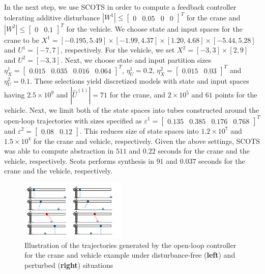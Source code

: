 In the next step, we use SCOTS in order to compute a feedback controller tolerating additive disturbance $|W^1|\leq\begin{bmatrix}0&0.05&0&0\end{bmatrix}^T$ for the crane and $|W^2|\leq\begin{bmatrix}0&0.1\end{bmatrix}^T$ for the vehicle. %
We choose state and input spaces for the crane to be $X^{1}=[-0.195,5.49]\times[-1.99,4.37]\times[1.20,4.68]\times[-5.44,5.28]$ and $U^{1}=[-7,7]$, respectively. For the vehicle, we set $X^{2}=[-3,3]\times[2,9]$ and $U^{2}=[-3,3]$. %
Next, we choose state and input partition sizes $\eta_{{X}}^{1}=\begin{bmatrix}0.015&0.035&0.016&0.064\end{bmatrix}^T$, $\eta_{U}^1=0.2$,  $\eta_{{X}}^2=\begin{bmatrix}0.015&0.03\end{bmatrix}^T$ and $\eta_{U}^2=0.1$. These selections yield discretized models with state and input spaces having $2.5\times 10^9$ and $|\hat U^{(1)}|=71$ for the crane, and $2\times 10^5$ and $61$ points for the vehicle. Next, we limit both of the state spaces into tubes constructed around the open-loop trajectories with sizes specified as $\varepsilon^{1}=\begin{bmatrix}0.135&0.385&0.176 &0.768\end{bmatrix}^T$ and $\varepsilon^{2}=\begin{bmatrix}0.08&0.12\end{bmatrix}$. This reduces size of state spaces into $1.2\times 10^7$ and $1.5\times 10^4$ for the crane and vehicle, respectively. Given the above settings, SCOTS was able to compute abstraction in $511$ and $0.22$ seconds for the crane and the vehicle, respectively. Scots performs synthesis in $91$ and $0.037$ seconds for the crane and the vehicle, respectively.
			
\begin{figure}[t]
	\centering
	\includegraphics[width=0.45\textwidth]{figures/crane_and_forklifter.pdf}
	\caption{Illustration of the trajectories generated by the open-loop controller for the crane and vehicle example under disturbance-free (\textbf{left}) and perturbed (\textbf{right}) situations} 
	\label{fig:cr_and_lft_2}
\end{figure}


